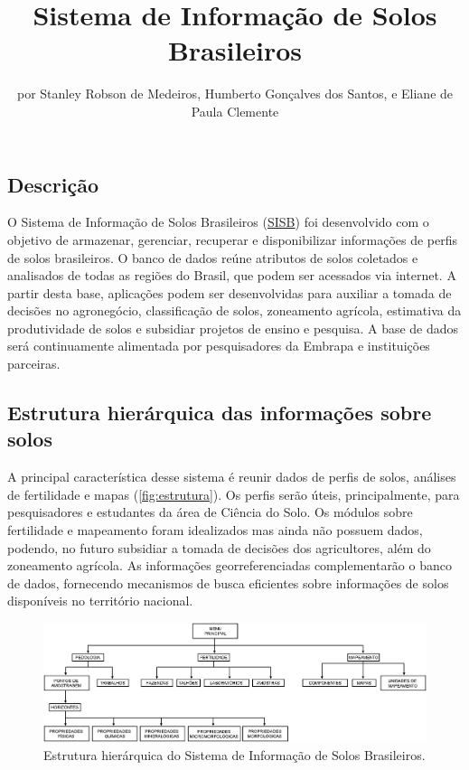 \title{Sistema de Informação de Solos Brasileiros}
\author{por Stanley Robson de Medeiros, Humberto Gonçalves dos Santos, e Eliane de Paula Clemente}
\maketitle

\newcommand{\SISB}{\href{http://www.bdsolos.cnptia.embrapa.br/consulta_publica.html}{SISB}}

\subsection{Descrição}

O Sistema de Informação de Solos Brasileiros (\SISB) foi desenvolvido com o objetivo de armazenar, gerenciar, recuperar e disponibilizar informações de perfis de solos brasileiros. O banco de dados reúne atributos de solos coletados e analisados de todas as regiões do Brasil, que podem ser acessados via internet. A partir desta base, aplicações podem ser desenvolvidas para auxiliar a tomada de decisões no agronegócio, classificação de solos, zoneamento agrícola, estimativa da produtividade de solos e subsidiar projetos de ensino e pesquisa. A base de dados será continuamente alimentada por pesquisadores da Embrapa e instituições parceiras.

\subsection{Estrutura hierárquica das informações sobre solos}

A principal característica desse sistema é reunir dados de perfis de solos, análises de fertilidade e mapas (\autoref{fig:estrutura}). Os perfis serão úteis, principalmente, para pesquisadores e estudantes da área de Ciência do Solo. Os módulos sobre fertilidade e mapeamento foram idealizados mas ainda não possuem dados, podendo, no futuro subsidiar a tomada de decisões dos agricultores, além do zoneamento agrícola. As informações georreferenciadas complementarão o banco de dados, fornecendo mecanismos de busca eficientes sobre informações de solos disponíveis no território nacional.

\begin{figure}[tb!]
  \begin{minipage}[t]{\linewidth}
    \centering
    \includegraphics{figuras/estrutura}
    \caption{Estrutura hierárquica do Sistema de Informação de Solos Brasileiros.}
    \label{fig:estrutura}
  \end{minipage}
\end{figure}

